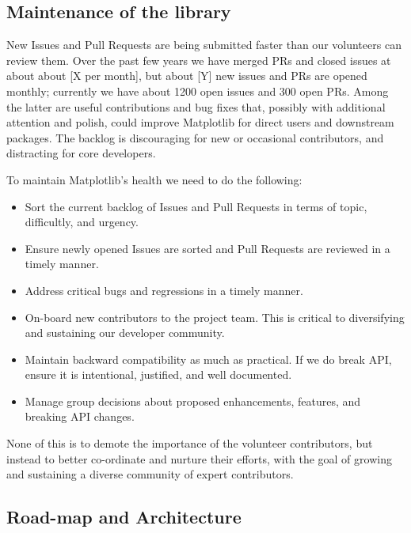 \documentclass[11pt]{article}  %
\begin{document}
\subsection{Maintenance of the library}

New Issues and Pull Requests are being submitted faster than our
volunteers can review them.
Over the past few years we have merged PRs and closed
issues at about about [X per month], but about [Y] new issues and PRs
are opened monthly; currently we have about 1200 open issues and
300 open PRs.
Among the latter are useful contributions and bug fixes
that, possibly with additional attention and polish, could improve
Matplotlib for direct users and downstream packages.
The backlog is
discouraging for new or occasional contributors, and distracting for
core developers.

To maintain Matplotlib's health we need to do the following:

\begin{itemize}[noitemsep]
\item Sort the current backlog of Issues and Pull Requests
  in terms of topic, difficultly, and urgency.
\item Ensure newly opened Issues are sorted and Pull Requests
  are reviewed in a timely manner.
\item Address critical bugs and regressions in a timely manner.
\item On-board new contributors to the project team.  This is
  critical to diversifying and sustaining our developer community.
\item Maintain backward compatibility as much as practical.  If we do
  break API, ensure it is intentional, justified, and well documented.
\item Manage group decisions about proposed enhancements, features, and
  breaking API changes.
\end{itemize}

None of this is to demote the importance of the volunteer
contributors, but instead to better co-ordinate and nurture their
efforts, with the goal of growing and sustaining a diverse community
of expert contributors.

\subsection{Road-map and Architecture }
\end{document}
